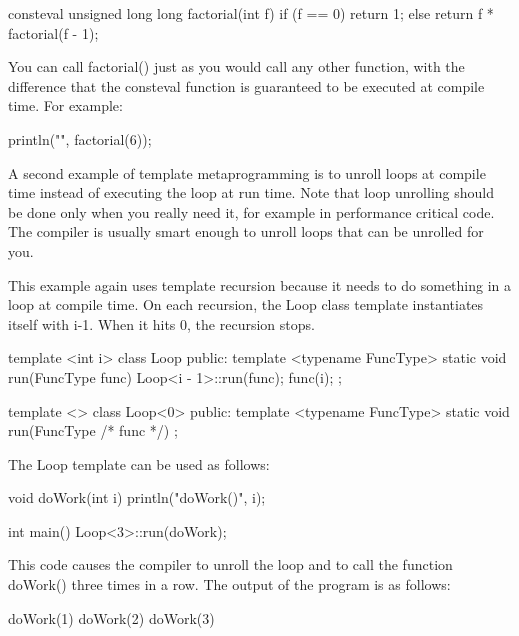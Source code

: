 \begin{cpp}
consteval unsigned long long factorial(int f)
{
    if (f == 0) { return 1; }
    else { return f * factorial(f - 1); }
}
\end{cpp}

You can call factorial() just as you would call any other function, with the difference that the consteval function is guaranteed to be executed at compile time. For example:

\begin{cpp}
println("{}", factorial(6));
\end{cpp}


A second example of template metaprogramming is to unroll loops at compile time instead of executing the loop at run time. Note that loop unrolling should be done only when you really need it, for example in performance critical code. The compiler is usually smart enough to unroll loops that can be unrolled for you.

This example again uses template recursion because it needs to do something in a loop at compile time. On each recursion, the Loop class template instantiates itself with i-1. When it hits 0, the recursion stops.

\begin{cpp}
template <int i>
class Loop
{
    public:
        template <typename FuncType>
        static void run(FuncType func) {
            Loop<i - 1>::run(func);
            func(i);
        }
};

template <>
class Loop<0>
{
    public:
        template <typename FuncType>
        static void run(FuncType /* func */) { }
};
\end{cpp}

The Loop template can be used as follows:

\begin{cpp}
void doWork(int i) { println("doWork({})", i); }

int main()
{
    Loop<3>::run(doWork);
}
\end{cpp}

This code causes the compiler to unroll the loop and to call the function doWork() three times in a row. The output of the program is as follows:

\begin{shell}
doWork(1)
doWork(2)
doWork(3)
\end{shell}


